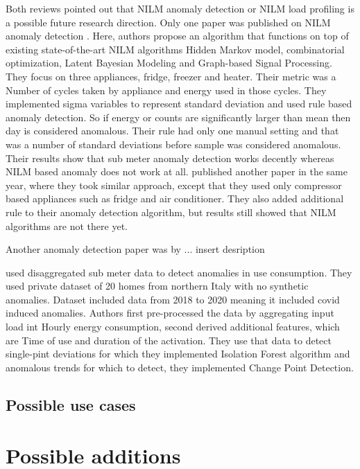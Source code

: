 \documentclass[
11pt, %
english, %
singlespacing, %
headsepline, %
]{MastersDoctoralThesis} %
\begin{document}
Both reviews pointed out that NILM anomaly detection or NILM load profiling is a possible future research direction.
Only one paper was published on NILM anomaly detection \cite{NILMAD2019}. Here, authors propose an algorithm
that functions on top of existing state-of-the-art NILM algorithms Hidden Markov model, combinatorial optimization, Latent Bayesian Modeling and Graph-based Signal Processing.
They focus on three appliances, fridge, freezer and heater. Their metric was a Number of cycles taken by appliance and energy used in those cycles. 
They implemented sigma variables to represent standard deviation 
and used rule based anomaly detection. So if energy or counts are significantly larger than mean then day is considered anomalous.
Their rule had only one manual setting and that was a number of standard deviations before sample was considered anomalous.
Their results show that sub meter anomaly detection works decently whereas NILM based anomaly does not work at all. 
\cite{NILMAD22019} published another paper in the same year, where they took similar approach, except that they used 
only compressor based appliances such as fridge and air conditioner. They also added additional rule to their anomaly 
detection algorithm, but results still showed that NILM algorithms are not there yet. 

Another anomaly detection paper was by \cite{NILMAD2021}... insert desription

\cite{Castangia2021} used disaggregated sub meter data to detect anomalies in use consumption.
They used private dataset of 20 homes from northern Italy with no synthetic anomalies. 
Dataset included data from 2018 to 2020 meaning it included covid induced anomalies. 
Authors first pre-processed the data by aggregating input load int Hourly energy consumption, 
second derived additional features, which are Time of use and duration of the activation.
They use that data to detect single-pint deviations for which they implemented Isolation Forest algorithm and
anomalous trends for which to detect, they implemented Change Point Detection. 


\subsection{Possible use cases}


\section{Possible additions}
\end{document}
